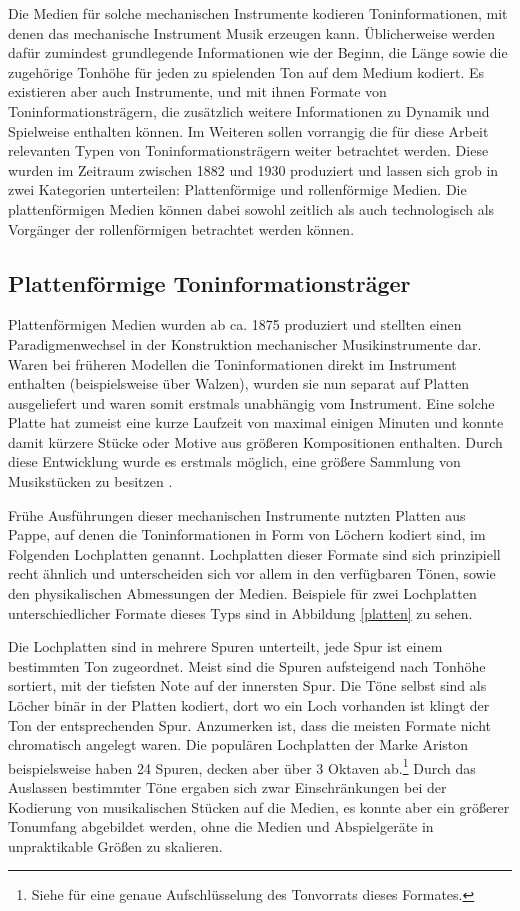 Die Medien für solche mechanischen Instrumente kodieren Toninformationen, mit denen das mechanische Instrument Musik erzeugen kann.
Üblicherweise werden dafür zumindest grundlegende Informationen wie der Beginn, die Länge sowie die zugehörige Tonhöhe für jeden zu spielenden Ton auf dem Medium kodiert.
Es existieren aber auch Instrumente, und mit ihnen Formate von Toninformationsträgern, die zusätzlich weitere Informationen zu Dynamik und Spielweise enthalten können.
Im Weiteren sollen vorrangig die für diese Arbeit relevanten Typen von Toninformationsträgern weiter betrachtet werden.
Diese wurden im Zeitraum zwischen 1882 und 1930 produziert und lassen sich grob in zwei Kategorien unterteilen: Plattenförmige und rollenförmige Medien.
Die plattenförmigen Medien können dabei sowohl zeitlich als auch technologisch als Vorgänger der rollenförmigen betrachtet werden können.

\subsection{Plattenförmige Toninformationsträger}

Plattenförmigen Medien wurden ab ca. 1875 produziert und stellten einen Paradigmenwechsel in der Konstruktion mechanischer Musikinstrumente dar.
Waren bei früheren Modellen die Toninformationen direkt im Instrument enthalten (beispielsweise über Walzen), wurden sie nun separat auf Platten ausgeliefert und waren somit erstmals unabhängig vom Instrument.
Eine solche Platte hat zumeist eine kurze Laufzeit von maximal einigen Minuten und konnte damit kürzere Stücke oder Motive aus größeren Kompositionen enthalten.
Durch diese Entwicklung wurde es erstmals möglich, eine größere Sammlung von Musikstücken zu besitzen \parencite[III.5.c. Plattenspieldosen und Drehinstrumente]{mgg_mechanische}.

Frühe Ausführungen dieser mechanischen Instrumente nutzten Platten aus Pappe, auf denen die Toninformationen in Form von Löchern kodiert sind, im Folgenden Lochplatten genannt.
Lochplatten dieser Formate sind sich prinzipiell recht ähnlich und unterscheiden sich vor allem in den verfügbaren Tönen, sowie den physikalischen Abmessungen der Medien.
Beispiele für zwei Lochplatten unterschiedlicher Formate dieses Typs sind in Abbildung \ref{platten} zu sehen.

Die Lochplatten sind in mehrere Spuren unterteilt, jede Spur ist einem bestimmten Ton zugeordnet.
Meist sind die Spuren aufsteigend nach Tonhöhe sortiert, mit der tiefsten Note auf der innersten Spur.
Die Töne selbst sind als Löcher binär in der Platten kodiert, dort wo ein Loch vorhanden ist klingt der Ton der entsprechenden Spur.
Anzumerken ist, dass die meisten Formate nicht chromatisch angelegt waren.
Die populären Lochplatten der Marke Ariston beispielsweise haben 24 Spuren, decken aber über 3 Oktaven ab.\footnote{Siehe \textcite[]{mxp_2003520} für eine genaue Aufschlüsselung des Tonvorrats dieses Formates.}
Durch das Auslassen bestimmter Töne ergaben sich zwar Einschränkungen bei der Kodierung von musikalischen Stücken auf die Medien, es konnte aber ein größerer Tonumfang abgebildet werden, ohne die Medien und Abspielgeräte in unpraktikable Größen zu skalieren.


